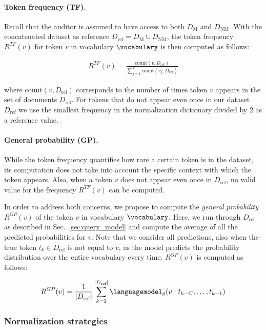 \documentclass[twocolumn,10pt]{article}
\begin{document}
\paragraph{\textbf{Token frequency (TF).}} Recall that the auditor is assumed to have access to both $D_{\text{M}}$ and $D_{\text{NM}}$. With the concatenated dataset as reference $D_{\text{ref}} = D_{\text{M}} \cup D_{\text{NM}}$, the token frequency ${R^{TF}(v)}$ for token $v$ in vocabulary $\vocabulary$ is then computed as follows:

\begin{align}
{R^{TF}(v)} = \frac{\text{count}(v, D_\text{ref})} {\sum_{j=1}^{V} \text{count}(v_j,D_\text{ref})}
\end{align}

where $\text{count}(v, D_\text{ref})$ corresponds to the number of times token $v$ appears in the set of documents $D_\text{ref}$. For tokens that do not appear even once in our dataset $D_{\text{ref}}$ we use the smallest frequency in the normalization dictionary divided by 2 as a reference value.

\paragraph{\textbf{General probability (GP).}} While the token frequency quantifies how rare a certain token is in the dataset, its computation does not take into account the specific context with which the token appears. Also, when a token $v$ does not appear even once in $D_\text{ref}$, no valid value for the frequency ${R^{TF}(v)}$ can be computed. 

In order to address both concerns, we propose to compute the \emph{general probability} $R^{GP}(v)$ of the token $v$ in vocabulary $\vocabulary$. Here, we run through $D_\text{ref}$ as described in Sec.~\ref{sec:query_model} and compute the average of all the predicted probabilities for $v$. Note that we consider all predictions, also when the true token $t_k \in D_\text{ref}$ is not equal to $v$, as the model predicts the probability distribution over the entire vocabulary every time. $R^{GP}(v)$ is computed as follows: 

\begin{align}
R^{GP}(v) = \frac{1}{|D_\text{ref}|} \sum_{k=1}^{|D_\text{ref}|} \languagemodel_{\theta}(v \mid t_{k-C}, \ldots, t_{k-1})
\end{align}

\subsubsection{Normalization strategies}
\end{document}
